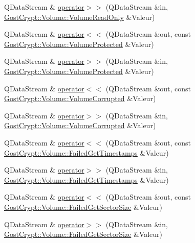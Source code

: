 \begin{DoxyCompactItemize}
Q\+Data\+Stream \& \hyperlink{namespace_gost_crypt_1_1_volume_a12c9aee121cd1e4ef5fd4dcb65f08eba}{operator$>$$>$} (Q\+Data\+Stream \&in, \hyperlink{class_gost_crypt_1_1_volume_1_1_volume_read_only}{Gost\+Crypt\+::\+Volume\+::\+Volume\+Read\+Only} \&Valeur)
\item 
Q\+Data\+Stream \& \hyperlink{namespace_gost_crypt_1_1_volume_a1e8cf928585ecda1b8bacaa453abbdfc}{operator$<$$<$} (Q\+Data\+Stream \&out, const \hyperlink{class_gost_crypt_1_1_volume_1_1_volume_protected}{Gost\+Crypt\+::\+Volume\+::\+Volume\+Protected} \&Valeur)
\item 
Q\+Data\+Stream \& \hyperlink{namespace_gost_crypt_1_1_volume_ac098df2452bbbac996b550b685b71ea0}{operator$>$$>$} (Q\+Data\+Stream \&in, \hyperlink{class_gost_crypt_1_1_volume_1_1_volume_protected}{Gost\+Crypt\+::\+Volume\+::\+Volume\+Protected} \&Valeur)
\item 
Q\+Data\+Stream \& \hyperlink{namespace_gost_crypt_1_1_volume_a497c0100f1aeadf02215ddfc1819da61}{operator$<$$<$} (Q\+Data\+Stream \&out, const \hyperlink{class_gost_crypt_1_1_volume_1_1_volume_corrupted}{Gost\+Crypt\+::\+Volume\+::\+Volume\+Corrupted} \&Valeur)
\item 
Q\+Data\+Stream \& \hyperlink{namespace_gost_crypt_1_1_volume_ad8380b8bdb6f81298284dcdf49f45085}{operator$>$$>$} (Q\+Data\+Stream \&in, \hyperlink{class_gost_crypt_1_1_volume_1_1_volume_corrupted}{Gost\+Crypt\+::\+Volume\+::\+Volume\+Corrupted} \&Valeur)
\item 
Q\+Data\+Stream \& \hyperlink{namespace_gost_crypt_1_1_volume_a600566c38b817173ce7a12607d514c7a}{operator$<$$<$} (Q\+Data\+Stream \&out, const \hyperlink{class_gost_crypt_1_1_volume_1_1_failed_get_timestamps}{Gost\+Crypt\+::\+Volume\+::\+Failed\+Get\+Timestamps} \&Valeur)
\item 
Q\+Data\+Stream \& \hyperlink{namespace_gost_crypt_1_1_volume_a976a45e024ee914284bafac02176a7bb}{operator$>$$>$} (Q\+Data\+Stream \&in, \hyperlink{class_gost_crypt_1_1_volume_1_1_failed_get_timestamps}{Gost\+Crypt\+::\+Volume\+::\+Failed\+Get\+Timestamps} \&Valeur)
\item 
Q\+Data\+Stream \& \hyperlink{namespace_gost_crypt_1_1_volume_a9bc5f7ec717f211b8d3c01f2163f3fa8}{operator$<$$<$} (Q\+Data\+Stream \&out, const \hyperlink{class_gost_crypt_1_1_volume_1_1_failed_get_sector_size}{Gost\+Crypt\+::\+Volume\+::\+Failed\+Get\+Sector\+Size} \&Valeur)
\item 
Q\+Data\+Stream \& \hyperlink{namespace_gost_crypt_1_1_volume_a8f37b1f061b7e84cfce701493bb13c58}{operator$>$$>$} (Q\+Data\+Stream \&in, \hyperlink{class_gost_crypt_1_1_volume_1_1_failed_get_sector_size}{Gost\+Crypt\+::\+Volume\+::\+Failed\+Get\+Sector\+Size} \&Valeur)

\end{DoxyCompactItemize}

